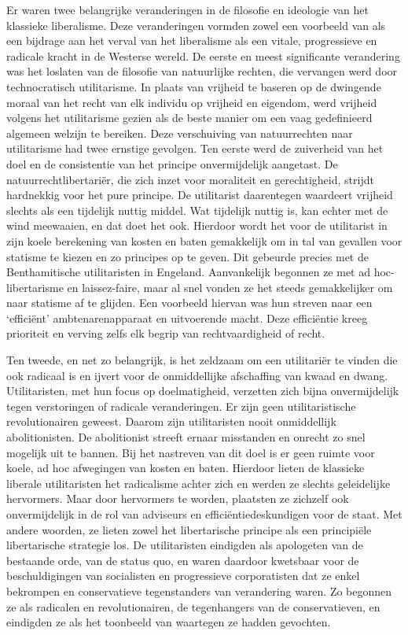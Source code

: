 \documentclass[
  a5paper,
  smalldemyvopaper,10pt,twoside,onecolumn,openright,extrafontsizes,hidelinks]{memoir}
\begin{document}
Er waren twee belangrijke veranderingen in de filosofie en ideologie van
het klassieke liberalisme. Deze veranderingen vormden zowel een
voorbeeld van als een bijdrage aan het verval van het liberalisme als
een vitale, progressieve en radicale kracht in de Westerse wereld. De
eerste en meest significante verandering was het loslaten van de
filosofie van natuurlijke rechten, die vervangen werd door
technocratisch utilitarisme. In plaats van vrijheid te baseren op de
dwingende moraal van het recht van elk individu op vrijheid en eigendom,
werd vrijheid volgens het utilitarisme gezien als de beste manier om een
vaag gedefinieerd algemeen welzijn te bereiken. Deze verschuiving van
natuurrechten naar utilitarisme had twee ernstige gevolgen. Ten eerste
werd de zuiverheid van het doel en de consistentie van het principe
onvermijdelijk aangetast. De natuurrechtlibertariër, die zich inzet voor
moraliteit en gerechtigheid, strijdt hardnekkig voor het pure principe.
De utilitarist daarentegen waardeert vrijheid slechts als een tijdelijk
nuttig middel. Wat tijdelijk nuttig is, kan echter met de wind
meewaaien, en dat doet het ook. Hierdoor wordt het voor de utilitarist
in zijn koele berekening van kosten en baten gemakkelijk om in tal van
gevallen voor statisme te kiezen en zo principes op te geven. Dit
gebeurde precies met de Benthamitische utilitaristen in Engeland.
Aanvankelijk begonnen ze met ad hoc-libertarisme en laissez-faire, maar
al snel vonden ze het steeds gemakkelijker om naar statisme af te
glijden. Een voorbeeld hiervan was hun streven naar een `efficiënt'
ambtenarenapparaat en uitvoerende macht. Deze efficiëntie kreeg
prioriteit en verving zelfs elk begrip van rechtvaardigheid of recht.

Ten tweede, en net zo belangrijk, is het zeldzaam om een utilitariër te
vinden die ook radicaal is en ijvert voor de onmiddellijke afschaffing
van kwaad en dwang. Utilitaristen, met hun focus op doelmatigheid,
verzetten zich bijna onvermijdelijk tegen verstoringen of radicale
veranderingen. Er zijn geen utilitaristische revolutionairen geweest.
Daarom zijn utilitaristen nooit onmiddellijk abolitionisten. De
abolitionist streeft ernaar misstanden en onrecht zo snel mogelijk uit
te bannen. Bij het nastreven van dit doel is er geen ruimte voor koele,
ad hoc afwegingen van kosten en baten. Hierdoor lieten de klassieke
liberale utilitaristen het radicalisme achter zich en werden ze slechts
geleidelijke hervormers. Maar door hervormers te worden, plaatsten ze
zichzelf ook onvermijdelijk in de rol van adviseurs en
efficiëntiedeskundigen voor de staat. Met andere woorden, ze lieten
zowel het libertarische principe als een principiële libertarische
strategie los. De utilitaristen eindigden als apologeten van de
bestaande orde, van de status quo, en waren daardoor kwetsbaar voor de
beschuldigingen van socialisten en progressieve corporatisten dat ze
enkel bekrompen en conservatieve tegenstanders van verandering waren. Zo
begonnen ze als radicalen en revolutionairen, de tegenhangers van de
conservatieven, en eindigden ze als het toonbeeld van waartegen ze
hadden gevochten.
\end{document}
